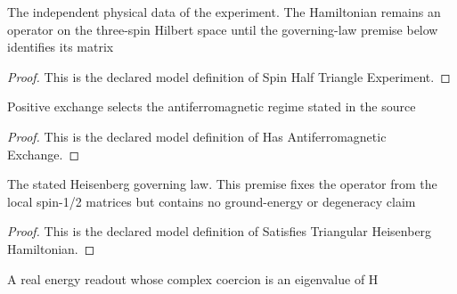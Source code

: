 \begin{definition}
  \label{def:physics:phyx-mini-0606:phyxminiproblems-problemphyxmini0606-spinhalftriangleexperiment}
  The independent physical data of the experiment. The Hamiltonian remains an operator on the three-spin Hilbert space until the governing-law premise below identifies its matrix
\end{definition}
\begin{proof}
  This is the declared model definition of Spin Half Triangle Experiment.
\end{proof}
\begin{definition}
  \label{def:physics:phyx-mini-0606:phyxminiproblems-problemphyxmini0606-hasantiferromagneticexchange}
  Positive exchange selects the antiferromagnetic regime stated in the source
\end{definition}
\begin{proof}
  This is the declared model definition of Has Antiferromagnetic Exchange.
\end{proof}
\begin{definition}
  \label{def:physics:phyx-mini-0606:phyxminiproblems-problemphyxmini0606-satisfiestriangularheisenberghamiltonian}
  The stated Heisenberg governing law. This premise fixes the operator from the local spin-1/2 matrices but contains no ground-energy or degeneracy claim
\end{definition}
\begin{proof}
  This is the declared model definition of Satisfies Triangular Heisenberg Hamiltonian.
\end{proof}
\begin{definition}
  \label{def:physics:phyx-mini-0606:phyxminiproblems-problemphyxmini0606-hasenergyeigenvalue}
  A real energy readout whose complex coercion is an eigenvalue of H
\end{definition}
